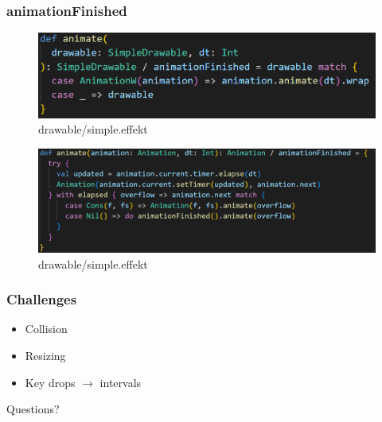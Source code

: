 \documentclass{beamer}
\begin{document}
	\begin{frame}
		\frametitle{animationFinished}
		\begin{figure}
			\includegraphics[width=.9\linewidth]{images/animate4.png}
			\caption{drawable/simple.effekt}
		\end{figure}
		\begin{figure}
			\includegraphics[width=.9\linewidth]{images/animate5.png}
			\caption{drawable/simple.effekt}
		\end{figure}
	\end{frame}
	
	
	\begin{frame}
		\frametitle{Challenges}
		\begin{Large}
		\begin{itemize}
			\setlength{\itemsep}{.8em}
			\item Collision
			\item Resizing
			\item Key drops $\rightarrow$ intervals
		\end{itemize}
		\end{Large}
	\end{frame}
	
	\begin{frame}[plain, c]
		\begin{center}
		\begin{Huge}
			Questions?
		\end{Huge}
		\end{center}
	\end{frame}
	
	
	
	
	
	
	
	
	
\end{document}
